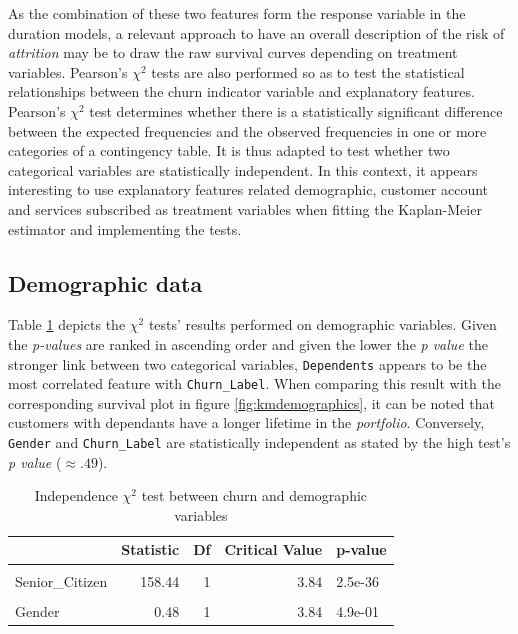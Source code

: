 \documentclass[
]{book}
\begin{document}
As the combination of these two features form the response variable in the duration models, a relevant approach to have an overall description of the risk of \emph{attrition} may be to draw the raw survival curves depending on treatment variables. Pearson's \(\chi^2\) tests are also performed so as to test the statistical relationships between the churn indicator variable and explanatory features. Pearson's \(\chi^2\) test determines whether there is a statistically significant difference between the expected frequencies and the observed frequencies in one or more categories of a contingency table. It is thus adapted to test whether two categorical variables are statistically independent. In this context, it appears interesting to use explanatory features related demographic, customer account and services subscribed as treatment variables when fitting the Kaplan-Meier estimator and implementing the tests.

\hypertarget{demographic-data}{%
\subsection*{Demographic data}\label{demographic-data}}

Table \ref{tab:chi2demographics} depicts the \(\chi^2\) tests' results performed on demographic variables. Given the \emph{p-values} are ranked in ascending order and given the lower the \emph{p value} the stronger link between two categorical variables, \texttt{Dependents} appears to be the most correlated feature with \texttt{Churn\_Label}. When comparing this result with the corresponding survival plot in figure \ref{fig:kmdemographics}, it can be noted that customers with dependants have a longer lifetime in the \emph{portfolio}. Conversely, \texttt{Gender} and \texttt{Churn\_Label} are statistically independent as stated by the high test's \emph{p value} (\(\approx .49\)).

\begin{table}[H]

\caption{\label{tab:chi2demographics}Independence $\chi^2$ test between churn and demographic variables}
\centering
\begin{tabular}[t]{lrrrl}
\toprule
  & Statistic & Df & Critical Value & p-value\\
\midrule
\cellcolor{gray!6}{Dependents} & \cellcolor{gray!6}{431.65} & \cellcolor{gray!6}{1} & \cellcolor{gray!6}{3.84} & \cellcolor{gray!6}{7.1e-96}\\
Senior\_Citizen & 158.44 & 1 & 3.84 & 2.5e-36\\
\cellcolor{gray!6}{Partner} & \cellcolor{gray!6}{157.50} & \cellcolor{gray!6}{1} & \cellcolor{gray!6}{3.84} & \cellcolor{gray!6}{4e-36}\\
Gender & 0.48 & 1 & 3.84 & 4.9e-01\\
\bottomrule
\end{tabular}
\end{table}
\end{document}
